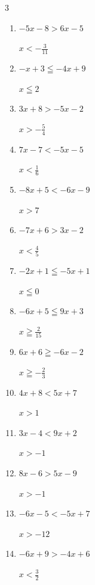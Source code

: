 \begin{multicols}{3}
\begin{enumerate}
        $\displaystyle x\leqq \frac{9}{2}$

  \item $-5x-8>6x-5$

        $\displaystyle x<-\frac{3}{11}$

  \item $-x+3\leqq -4x+9$

        $\displaystyle x\leqq 2$

  \item $3x+8>-5x-2$

        $\displaystyle x>-\frac{5}{4}$

  \item $7x-7<-5x-5$

        $\displaystyle x<\frac{1}{6}$

  \item $-8x+5<-6x-9$

        $\displaystyle x>7$

  \item $-7x+6>3x-2$

        $\displaystyle x<\frac{4}{5}$

  \item $-2x+1\leqq -5x+1$

        $\displaystyle x\leqq 0$

  \item $-6x+5\leqq 9x+3$

        $\displaystyle x\geqq \frac{2}{15}$

  \item $6x+6\geqq -6x-2$

        $\displaystyle x\geqq -\frac{2}{3}$

\columnbreak %

  \item $4x+8<5x+7$

        $\displaystyle x>1$

  \item $3x-4<9x+2$

        $\displaystyle x>-1$

  \item $8x-6>5x-9$

        $\displaystyle x>-1$

  \item $-6x-5<-5x+7$

        $\displaystyle x>-12$

  \item $-6x+9>-4x+6$

        $\displaystyle x<\frac{3}{2}$


\end{enumerate}
\end{multicols}
